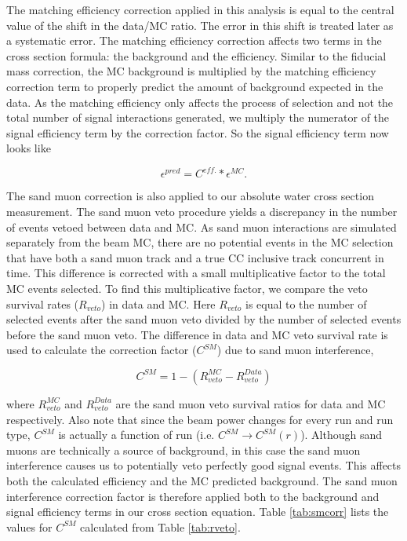 The matching efficiency correction applied in this analysis is equal to the central value of the shift in the data/MC ratio. The error in this shift is treated later as a systematic error. The matching efficiency correction affects two terms in the cross section formula: the background and the efficiency. Similar to the fiducial mass correction, the MC background is multiplied by the matching efficiency correction term to properly predict the amount of background expected in the data. As the matching efficiency only affects the process of selection and not the total number of signal interactions generated, we multiply the numerator of the signal efficiency term by the correction factor. So the signal efficiency term now looks like

\begin{equation}
\epsilon^{pred} = C^{eff.}* \epsilon^{MC}.
\end{equation}

The sand muon correction is also applied to our absolute water cross section measurement. The sand muon veto procedure yields a discrepancy in the number of events vetoed between data and MC. As sand muon interactions are simulated separately from the beam MC, there are no potential events in the MC selection that have both a sand muon track and a true CC inclusive track concurrent in time. This difference is corrected with a small multiplicative factor to the total MC events selected. To find this multiplicative factor, we compare the veto survival rates ($R_{veto}$) in data and MC. Here $R_{veto}$ is equal to the number of selected events after the sand muon veto divided by the number of selected events before the sand muon veto. The difference in data and MC veto survival rate is used to calculate the correction factor ($C^{SM}$) due to sand muon interference,

\begin{equation}
C^{SM} = 1-(R^{MC}_{veto} - R^{Data}_{veto})
\end{equation}

\noindent where $R^{MC}_{veto}$ and $R^{Data}_{veto}$ are the sand muon veto survival ratios for data and MC respectively. Also note that since the beam power changes for every run and run type, $C^{SM}$ is actually a function of run (i.e. $C^{SM} \rightarrow C^{SM}(r)$). Although sand muons are technically a source of background, in this case the sand muon interference causes us to potentially veto perfectly good signal events. This affects both the calculated efficiency and the MC predicted background. The sand muon interference correction factor is therefore applied both to the background and signal efficiency terms in our cross section equation. Table \ref{tab:smcorr} lists the values for $C^{SM}$ calculated from Table \ref{tab:rveto}. 

